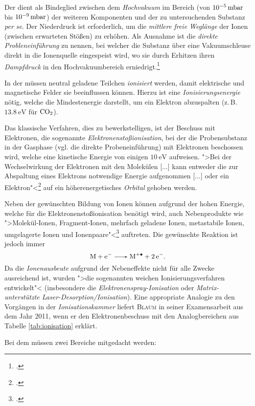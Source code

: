 \begin{items}
\item Der  dient als Bindeglied zwischen dem \textit{Hochvakuum} im Bereich (von $\SI{E-5}{\milli\bar}$ bis $\SI{E-9}{\milli\bar}$) der weiteren Komponenten und der zu untersuchenden Substanz \textit{per se}. Der Niederdruck ist erforderlich, um die \textit{mittlere freie Weglänge} der Ionen (zwischen erwarteten Stößen) zu erhöhen. Als Ausnahme ist die \textit{direkte Probleneinführung} zu nennen, bei welcher die Substanz über eine Vakuumschleuse direkt in die Ionenquelle eingespeist wird, wo sie durch Erhitzen ihren \textit{Dampfdruck} in den Hochvakuumbereich erniedrigt.\footcite[vgl.][S\,12]{Budz2005}
\item In der  müssen neutral geladene Teilchen \textit{ionisiert} werden, damit elektrische und magnetische Felder sie beeinflussen können. Hierzu ist eine \textit{Ionisierungsenergie} nötig, welche die Mindestenergie darstellt, um ein Elektron abzuspalten (z.\,B. $\SI{13.8}{\electronvolt}$ für $\ce{CO2}$).

Das klassische Verfahren, dies zu bewerkstelligen, ist der Beschuss mit Elektronen, die sogenannte \textit{Elektronenstoßionisation}, bei der die Probensubstanz in der Gasphase (vgl. die direkte Probeneinführung) mit Elektronen beschossen wird, welche eine kinetische Energie von einigen $\SI{10}{\electronvolt}$ aufweisen. ">Bei der Wechselwirkung der Elektronen mit den Molekülen [...] kann entweder die zur Abspaltung eines Elektrons notwendige Energie aufgenommen [...] oder ein Elektron"<\footcite[S.\,18]{Budz2005} auf ein höherenergetisches \textit{Orbital} gehoben werden.

Neben der gewünschten Bildung von Ionen können aufgrund der hohen Energie, welche für die Elektronenstoßionisation benötigt wird, auch Nebenprodukte wie ">Molekül-Ionen, Fragment-Ionen, mehrfach geladene Ionen, metastabile Ionen, umgelagerte Ionen und Ionenpaare"<\footcite[S.\,26]{Gross2012} auftreten. Die gewünschte Reaktion ist jedoch immer
\begin{equation*}
\ce{M + e- -> M^{+.} + 2e-}.
\end{equation*}
Da die \textit{Ionenausbeute} aufgrund der Nebeneffekte nicht für alle Zwecke ausreichend ist, wurden ">die sogenannten weichen Ionisierungsverfahren entwickelt"<\vspace*{-2cm}\vspace*{2cm} (insbesondere die \textit{Elektronenspray-Ionisation} oder \textit{Matrix-unterstützte Laser-Desorption/Ionisation}).
Eine appropriate Analogie zu den Vorgängen in der \textit{Ionisationskammer} liefert \textsc{Blaum} in seiner Examensarbeit aus dem Jahr 2011, wenn er den Elektronenbeschuss mit den Analogbereichen aus Tabelle \ref{tab:ionisation} erklärt.

\item Bei dem  müssen zwei Bereiche mitgedacht werden: 


\end{items}
